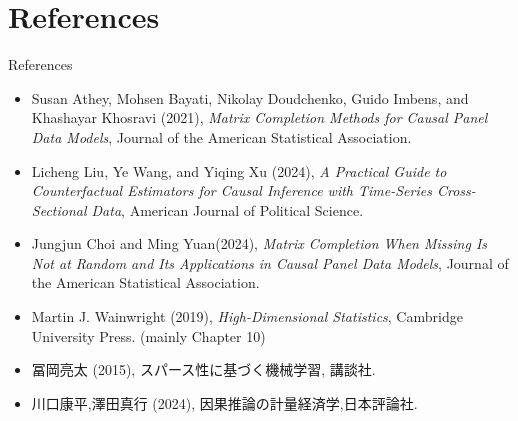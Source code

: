 \documentclass[xcolor=svgnames,aspectratio=169]{beamer}
\begin{document}
\section{References}

\begin{frame}{References}
    \begin{itemize}
        \item Susan Athey, Mohsen Bayati, Nikolay Doudchenko, Guido Imbens, and Khashayar Khosravi (2021), \textit{Matrix Completion Methods for Causal Panel Data Models}, Journal of the American Statistical Association.
        \item Licheng Liu, Ye Wang, and Yiqing Xu (2024), \textit{A Practical Guide to Counterfactual Estimators for Causal Inference with Time-Series Cross-Sectional Data},  American Journal of Political Science.
        \item Jungjun Choi and Ming Yuan(2024), \textit{Matrix Completion When Missing Is Not at Random and Its Applications in Causal Panel Data Models}, Journal of the American Statistical Association.
        \item Martin J. Wainwright (2019), \textit{High-Dimensional Statistics}, Cambridge University Press. (mainly Chapter 10)
        \item 冨岡亮太 (2015), スパース性に基づく機械学習, 講談社.
        \item 川口康平,澤田真行 (2024), 因果推論の計量経済学,日本評論社.
    \end{itemize}
\end{frame}
\end{document}
